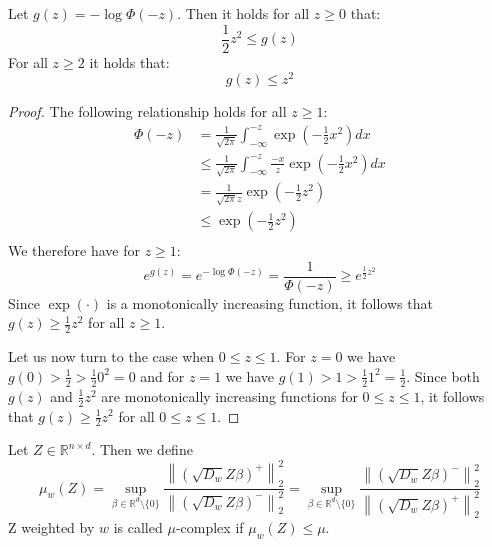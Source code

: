 \begin{lemma}
    Let $g(z) = -\log \Phi(-z)$. Then it holds for all $z \geq 0$ that:
    $$
        \frac{1}{2} z^2 \leq g(z)
    $$
    For all $z \geq 2$ it holds that:
    $$
        g(z) \leq z^2
    $$
\end{lemma}
\begin{proof}
    The following relationship holds for all $z \geq 1$:
    \begin{align*} 
        \Phi(-z) & = \frac{1}{\sqrt{2 \pi}} \int_{-\infty}^{-z} \exp{ \left(-\frac{1}{2} x^2 \right)} dx                 \\
                 & \leq \frac{1}{\sqrt{2 \pi}} \int_{-\infty}^{-z} \frac{-x}{z} \exp{ \left(-\frac{1}{2} x^2 \right)} dx \\
                 & = \frac{1}{\sqrt{2 \pi} z} \exp{\left( -\frac{1}{2} z^2 \right)}                                      \\
                 & \leq \exp{\left( -\frac{1}{2} z^2 \right)}                                                            \\
    \end{align*}
    We therefore have for $z \geq 1$:
    $$
        e^{g(z)} = e^{-\log \Phi(-z)} = \frac{1}{\Phi(-z)} \geq e^{\frac{1}{2} z^2}
    $$
    Since $\exp( \cdot )$ is a monotonically increasing function,
    it follows that $g(z) \geq \frac{1}{2}z^2$ for all $z \geq 1$.
    
    \noindent{}Let us now turn to the case when $0 \leq z \leq 1$.
    For $z=0$ we have $g(0) > \frac{1}{2} > \frac{1}{2} 0^2 = 0$ and
    for $z=1$ we have $g(1) > 1 > \frac{1}{2} 1^2 = \frac{1}{2}$.
    Since both $g(z)$ and $\frac{1}{2} z^2$ are monotonically increasing 
    functions for $0 \leq z \leq 1$, it follows that 
    $g(z) \geq \frac{1}{2} z^2$ for all $0 \leq z \leq 1$.
\end{proof}

\begin{definition}
    Let $Z \in \mathbb{R}^{n \times d}$. Then we define
    $$
        \mu_w(Z) = \sup_{\beta \in \mathbb{R}^d \setminus \{0\}}
        \frac{\left \lVert (\sqrt{D_w} Z \beta)^+ \right \rVert_2^2}
        {\left \lVert (\sqrt{D_w} Z \beta)^- \right \rVert_2^2}
        =
        \sup_{\beta \in \mathbb{R}^d \setminus \{0\}}
        \frac{\left \lVert (\sqrt{D_w} Z \beta)^- \right \rVert_2^2}
        {\left \lVert (\sqrt{D_w} Z \beta)^+ \right \rVert_2^2}
    $$
    Z weighted by $w$ is called $\mu$-complex if $\mu_w(Z) \leq \mu$.
\end{definition}

